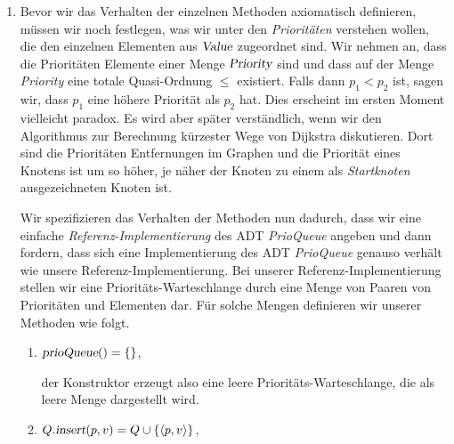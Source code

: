 \begin{Definition}
{\begin{enumerate}
\begin{enumerate}
              Der Aufruf $Q.\textsl{insert}(p,v)$ f\"ugt das Element $v$ mit der Priorit\"at $p$ in
              die Priorit\"ats-Warteschlange $Q$ ein.  
        \item $\textsl{remove}: \textsl{PrioQueue} \rightarrow \textsl{PrioQueue}$

              Der Aufruf $Q.\textsl{remove}()$ entfernt aus der Priorit\"ats-Warteschlange
              $Q$ das Element, das durch den Ausdruck $Q.\texttt{top}()$ berechnet wird.
        \end{enumerate}
\item Bevor wir das Verhalten der einzelnen Methoden axiomatisch definieren, m\"ussen wir
      noch festlegen, was wir unter den \emph{Priorit\"aten} verstehen wollen, die den
      einzelnen Elementen aus $\textsl{Value}$ zugeordnet sind.  Wir nehmen an, dass die
      Priorit\"aten Elemente einer Menge $\textsl{Priority}$ sind und dass auf der Menge \textsl{Priority}
      eine totale Quasi-Ordnung $\leq$ existiert. Falls dann $p_1 < p_2$ ist, sagen wir, 
      dass $p_1$ eine h\"ohere Priorit\"at als $p_2$ hat.  Dies erscheint im ersten Moment vielleicht
      paradox. Es wird aber sp\"ater verst\"andlich, wenn wir den Algorithmus zur
      Berechnung k\"urzester Wege von Dijkstra diskutieren. Dort sind die Priorit\"aten
      Entfernungen im Graphen und die Priorit\"at eines Knotens ist um so h\"oher, je n\"aher
      der Knoten zu einem als \emph{Startknoten} ausgezeichneten Knoten ist. 

      Wir spezifizieren das Verhalten der Methoden nun dadurch, dass wir eine einfache
      \emph{Referenz-Implementierung} des ADT \textsl{PrioQueue} angeben und dann fordern,
      dass sich eine Implementierung des ADT \textsl{PrioQueue} genauso verh\"alt wie unsere
      Referenz-Implementierung.  Bei unserer Referenz-Implementierung stellen wir eine
      Priorit\"ats-Warteschlange durch eine Menge von Paaren von Priorit\"aten und Elementen 
      dar.   F\"ur solche Mengen definieren wir unserer Methoden wie folgt.
      \begin{enumerate}
      \item $\textsl{prioQueue}() = \{\}$,

             der Konstruktor erzeugt also eine leere
            Priorit\"ats-Warteschlange, die als leere Menge dargestellt wird. 
      \item $Q.\textsl{insert}(p, v) = Q \cup \{ \pair(p,v) \}$,
        

\end{enumerate}
\end{enumerate}}
\end{Definition}

